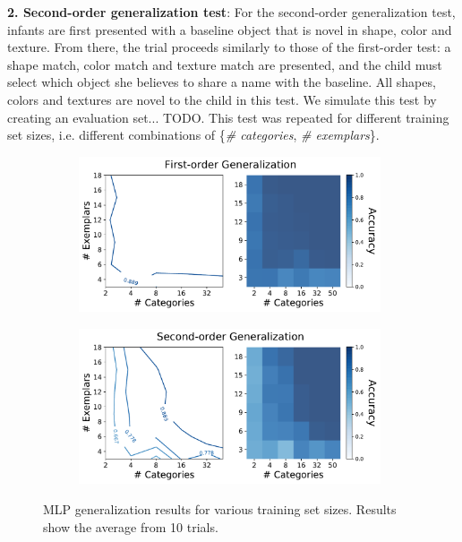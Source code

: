{\bf2. Second-order generalization test}: For the second-order generalization
test, infants are first presented with a baseline object that is novel in shape,
color and texture. From there, the trial proceeds similarly to those of the
first-order test: a shape match, color match and texture match are presented,
and the child must select which object she believes to share a name with the
baseline. All shapes, colors and textures are novel to the child in this test.
We simulate this test by creating an evaluation set... TODO.
This test was repeated for different training set
sizes, i.e. different combinations of \{\textit{\# categories},
\textit{\# exemplars}\}.

\begin{figure}[h]
    \begin{center}
        \begin{subfigure}[b]{0.48\textwidth}
            \begin{center}
                \includegraphics[width=0.98\textwidth]
                {figures/mlp_o1_acc.pdf}
            \end{center}
        \end{subfigure}
        \begin{subfigure}[b]{0.48\textwidth}
            \begin{center}
                \includegraphics[width=0.98\textwidth]
                {figures/mlp_o2_acc.pdf}
            \end{center}
        \end{subfigure}
    \end{center}
    \caption{MLP generalization results for various training set sizes. Results
    show the average from 10 trials.}
    \label{fig:mlp_gen_results}
\end{figure}

